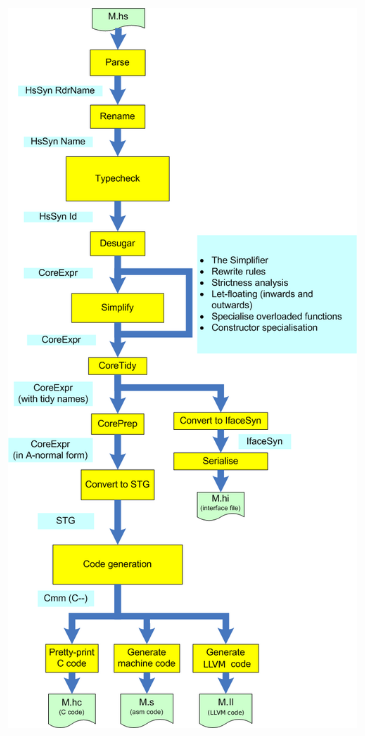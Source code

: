 \documentclass{article}
\begin{document}
	\includegraphics[width=4.57in,height=7.5in]{HscPipe2.png}
\end{document}
